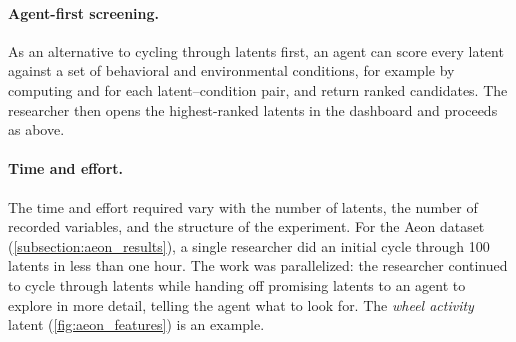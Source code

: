 \paragraph{Agent-first screening.}
As an alternative to cycling through latents first, an agent can score every latent against a set of behavioral and environmental conditions, for example by computing  and  for each latent--condition pair, and return ranked candidates. The researcher then opens the highest-ranked latents in the dashboard and proceeds as above.

\paragraph{Time and effort.}
The time and effort required vary with the number of latents, the number of recorded variables, and the structure of the experiment. For the Aeon dataset (\hyperref[subsection:aeon_results]{\ref*{subsection:aeon_results}}), a single researcher did an initial cycle through 100 latents in less than one hour. The work was parallelized: the researcher continued to cycle through latents while handing off promising latents to an agent to explore in more detail, telling the agent what to look for. The \textit{wheel activity} latent (\autoref{fig:aeon_features}) is an example.


